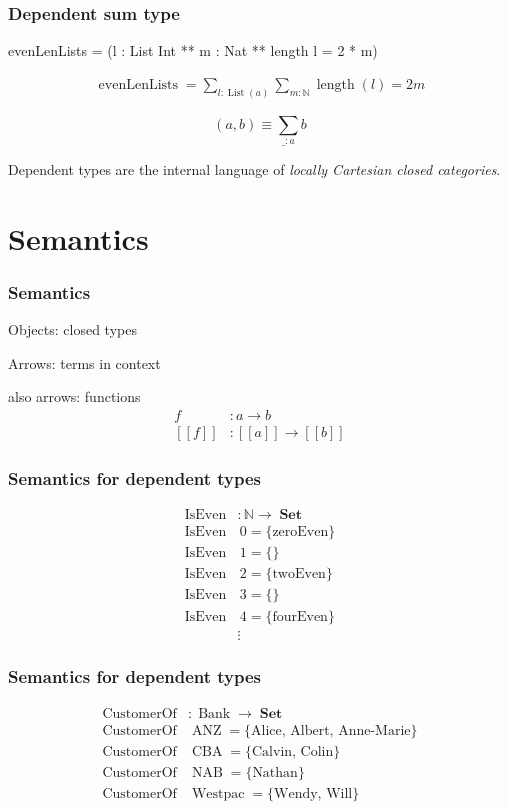 \documentclass[
  xcolor={usenames,dvipsnames,svgnames},
  ]{beamer}
\DeclareMathOperator{\Set}{\mathbf{Set}}
\DeclareMathOperator{\List}{List}
\DeclareMathOperator{\ANZ}{ANZ}
\DeclareMathOperator{\NAB}{NAB}
\DeclareMathOperator{\CBA}{CBA}
\DeclareMathOperator{\Westpac}{Westpac}
\DeclareMathOperator{\Bank}{Bank}
\DeclareMathOperator{\IsEven}{IsEven}
\DeclareMathOperator{\CustomerOf}{CustomerOf}
\newcommand{\N}{\ensuremath{\mathbb{N}}}
\begin{document}
\begin{frame}[fragile]
\frametitle{Dependent sum type}

\begin{code}
  evenLenLists = (l : List Int ** m : Nat ** length l = 2 * m)
\end{code}

\begin{align*}
  \operatorname{evenLenLists} = \sum_{l : \List(a)} \sum_{m:\N} \operatorname{length}(l) = 2m
\end{align*}

  \[
    (a, b) \equiv \sum_{\_ : a} b
  \]
\end{frame}

\begin{frame}
  Dependent types are the internal language of \textit{locally Cartesian closed categories}.
\end{frame}

\section{Semantics}

\begin{frame}
\frametitle{Semantics}
  Objects: closed types

  Arrows: terms in context

  also arrows: functions
  \begin{align*}
  f &: a \to b \\
  [[f]]  &:[[a]] \to [[b]]
  \end{align*}
\end{frame}

\begin{frame}
\frametitle{Semantics for dependent types}
  \begin{align*}
    \IsEven&: \N \to \Set  \\
    \IsEven &\, 0 = \{ \textrm{zeroEven} \} \\
    \IsEven &\, 1 = \{ \textrm{} \} \\
    \IsEven &\, 2 = \{ \textrm{twoEven} \} \\
    \IsEven &\, 3 = \{ \textrm{} \} \\
    \IsEven &\, 4 = \{ \textrm{fourEven} \} \\
    &\vdots
  \end{align*}
\end{frame}

\begin{frame}
\frametitle{Semantics for dependent types}
  \begin{align*}
    \CustomerOf&: \Bank \to \Set  \\
    \CustomerOf& \ANZ = \{ \textrm{Alice, Albert, Anne-Marie} \} \\
    \CustomerOf& \CBA = \{ \textrm{Calvin, Colin} \} \\
    \CustomerOf& \NAB = \{ \textrm{Nathan} \} \\
    \CustomerOf& \Westpac = \{ \textrm{Wendy, Will} \} \\
  \end{align*}

\end{frame}
\end{document}
